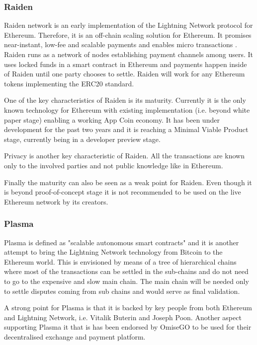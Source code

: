 \subsubsection{Raiden}
Raiden network is an early implementation of the Lightning Network protocol for Ethereum. Therefore, it is an off-chain scaling solution for Ethereum. It promises near-instant, low-fee and scalable payments and enables micro transactions \cite{Raiden}. Raiden runs as a network of nodes establishing payment channels among users. It uses locked funds in a smart contract in Ethereum and payments happen inside of Raiden until one party chooses to settle. Raiden will work for any Ethereum tokens implementing the ERC20 standard.

One of the key characteristics of Raiden is its maturity. Currently it is the only known technology for Ethereum with existing implementation (i.e. beyond white paper stage) enabling a working App Coin economy. It has been under development for the past two years and it is reaching a Minimal Viable Product stage, currently being in a developer preview stage.

Privacy is another key characteristic of Raiden.  All the transactions are known only to the involved parties and not public knowledge like in Ethereum.

Finally the maturity can also be seen as a weak point for Raiden. Even though it is beyond proof-of-concept stage it is not recommended to be used on the live Ethereum network by its creators.

\subsubsection{Plasma}
Plasma is defined as "scalable autonomous smart contracts" \cite{Plasma} and it is another attempt to bring the Lightning Network technology from Bitcoin to the Ethereum world. This is envisioned by means of a tree of hierarchical chains where most of the transactions can be settled in the sub-chains and do not need to go to the expensive and slow main chain. The main chain will be needed only to settle disputes coming from sub chains and would serve as final validation.

A strong point for Plasma is that it is backed by key people from both Ethereum and Lightning Network, i.e. Vitalik Buterin and Joseph Poon. Another aspect supporting Plasma it that is has been endorsed by OmiseGO to be used for their decentralised exchange and payment platform\cite{omisego_plasma}.

